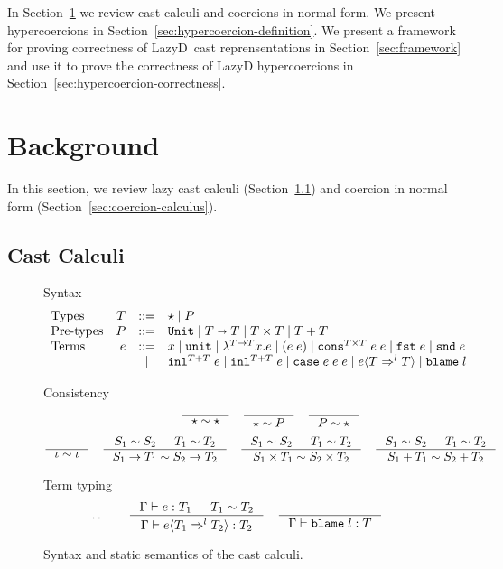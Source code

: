 \documentclass[acmsmall,review,anonymous]{acmart}\settopmatter{printfolios=true,printccs=false,printacmref=false}
\newcommand{\stxrule}[3]{\text{#2} & #1 & ::= & #3\\}
\newcommand{\stxrulecont}[1]{& & | & #1 \\}
\newcommand{\plus}[0]{+}
\newcommand{\judgetype}[3]{#1 \vdash #2 : #3}
\newcommand{\lazyD}{Lazy\;D}
\newcommand{\POOunit}[0]{\mathtt{Unit}}
\newcommand{\POOfun}[2]{#1 \shortrightarrow #2}
\newcommand{\POOprod}[2]{#1 \times #2}
\newcommand{\POOsum}[2]{#1 \plus #2}
\newcommand{\eOOvar}[1]{#1}
\newcommand{\eOOsole}[0]{\mathtt{unit}}
\newcommand{\eOOlam}[4]{\lambda^{#1\rightarrow{}#2}#3.#4}
\newcommand{\eOOapp}[2]{(#1 \; #2)}
\newcommand{\eOOcons}[4]{\mathtt{cons}^{\POOprod{#1}{#2}} \; #3 \; #4}
\newcommand{\eOOcar}[1]{\mathtt{fst} \; #1}
\newcommand{\eOOcdr}[1]{\mathtt{snd} \; #1}
\newcommand{\eOOinl}[3]{\mathtt{inl}^{\POOsum{#1}{#2}} \; #3}
\newcommand{\eOOcase}[3]{\mathtt{case} \; #1 \; #2 \; #3}
\newcommand{\eOOcast}[4]{#1 \langle \cOOcast{#2}{#3}{#4} \rangle}
\newcommand{\eOOblame}[1]{\mathtt{blame} \; #1}
\newcommand{\cOOcast}[3]{#1 \Rightarrow^{#2} #3}
\begin{document}
In Section~\ref{sec:background} we review cast calculi and coercions in normal 
form. 
We present hypercoercions in
Section~\ref{sec:hypercoercion-definition}.  We present a framework
for proving correctness of \lazyD\ cast reprensentations in
Section~\ref{sec:framework} and use it to prove the correctness of
\lazyD{} hypercoercions in
Section~\ref{sec:hypercoercion-correctness}.

\section{Background} \label{sec:background}

In this section, we review lazy cast calculi
(Section~\ref{sec:cast-calculi}) and coercion in normal form
(Section~\ref{sec:coercion-calculus}).

\subsection{Cast Calculi}
\label{sec:cast-calculi}

\begin{figure}
  Syntax
  \[
  \begin{array}{lrcl}
  \stxrule{T}{Types}{
    \star \mid{}
    P
  }
  \stxrule{P}{Pre-types}{
    \POOunit \mid
    \POOfun{T}{T} \mid
    \POOprod{T}{T} \mid
    \POOsum{T}{T}
  }
  \stxrule{e}{Terms}{
    \eOOvar{x} \mid{}
    \eOOsole{} \mid{}
    \eOOlam{T}{T}{x}{e} \mid
    \eOOapp{e}{e} \mid
    \eOOcons{T}{T}{e}{e} \mid
    \eOOcar{e} \mid
    \eOOcdr{e}
  }
  \stxrulecont{
    \eOOinl{T}{T}{e} \mid
    \eOOinl{T}{T}{e} \mid
    \eOOcase{e}{e}{e} \mid
    \eOOcast{e}{T}{l}{T} \mid
    \eOOblame{l}
  }
  \end{array}
  \]
  
  Consistency
  \begin{gather*}
  \inference{}{
    \star \sim \star
  } \quad
  \inference{}{
    \star \sim P
  } \quad
  \inference{}{
    P \sim \star
  } \\[1ex]
  \inference{}{
    \iota \sim \iota
  } \quad
  \inference{
    S_1 \sim S_2 &
    T_1 \sim T_2
  }{
    S_1 \rightarrow T_1 \sim S_2 \rightarrow T_2
  } \quad
  \inference{
    S_1 \sim S_2 &
    T_1 \sim T_2
  }{
    S_1 \times T_1 \sim S_2 \times T_2
  } \quad
  \inference{
    S_1 \sim S_2 &
    T_1 \sim T_2
  }{
    S_1 \plus T_1 \sim S_2 \plus T_2
  }
  \end{gather*}
  
  Term typing
  \fbox{$\judgetype{\Gamma}{e}{T}$}
  \begin{gather*}
          \dots \qquad
    \inference{
      \Gamma \vdash e : T_1 & T_1 \sim T_2
    }{
      \judgetype{\Gamma}{\eOOcast{e}{T_1}{l}{T_2}}{T_2}
    } \quad
    \inference{
    }{
      \judgetype{\Gamma}{\eOOblame{l}}{T}
    }
  \end{gather*}
  
  \caption{Syntax and static semantics of the cast calculi.}
  \label{fig:blame-static}
\end{figure}
\end{document}
